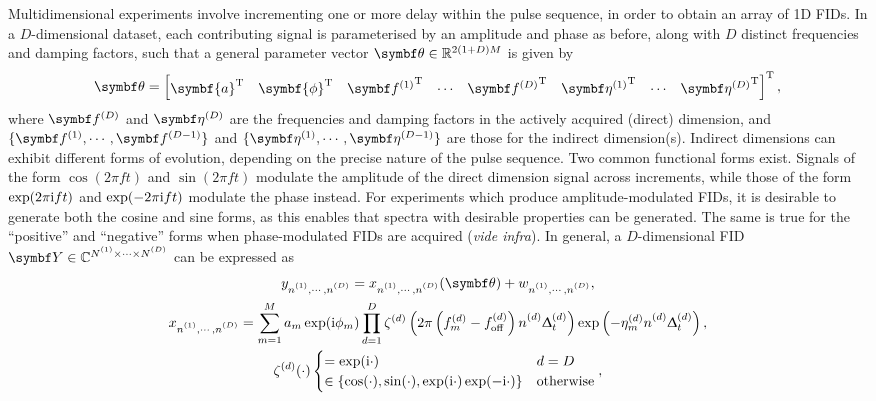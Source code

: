 Multidimensional experiments involve incrementing one or more delay within the
pulse sequence, in order to obtain an array of \ac{1D} \acp{FID}. In a
$D$-dimensional dataset, each contributing signal is parameterised by an
amplitude and phase as before, along with $D$ distinct frequencies and damping
factors, such that a general parameter vector  $\bth \in \mathbb{R}^{2(1+D)M}$
is given by
\begin{equation}
    \bth =
    \begin{bmatrix}
    \symbf{a}\T &
    \symbf{\phi}\T &
    {\bdfone}\T &
    \cdots &
    {\bdfD}\T &
    {\bdetaone}\T &
    \cdots &
    {\bdetaD}\T
    \end{bmatrix}\T,
    \label{eq:theta}
\end{equation}
where $\bdfD$ and $\bdetaD$ are the frequencies and damping factors in the
actively acquired (direct) dimension, and $\lbrace \bdfone, \cdots,
\bdfDminusone \rbrace$ and
$\lbrace \bdetaone, \cdots, \bdetaDminusone \rbrace$ are those for the indirect
dimension(s).
Indirect dimensions can exhibit different forms of evolution, depending on
the precise nature of the pulse sequence. Two common functional
forms exist\cite[Section 4.3.4]{Cavanagh2007}. Signals of the form $\cos(2 \pi
f t)$ and $\sin(2 \pi f t)$ modulate the amplitude of the direct
dimension signal across increments, while those of the form $\exp(2 \pi \mathrm{i} f
t)$ and $\exp(-2 \pi \mathrm{i} f t)$ modulate the phase instead.
For experiments which produce amplitude-modulated \acp{FID}, it is desirable to
generate both the cosine and sine forms, as this enables that spectra with
desirable properties can be generated. The same is true for the ``positive''
and ``negative'' forms when phase-modulated \acp{FID} are acquired (\emph{vide
infra}). In general, a $D$-dimensional \ac{FID} $\bY \in \mathbb{C}^{\None
\times \cdots \times \ND}$ can be expressed as
\begin{subequations}
    \begin{gather}
        \ynonenD = \xnonenD(\bth) + \wnonenD,\\
        \xnonenD
            = \sumM \amexpphim \prodD
            \zeta^{(d)}\left(2 \pi \left(f^{(d)}_m  - \foffd\right) \nd \Dtd\right)
            \exp\left(-\eta^{(d)}_m \nd \Dtd\right),\\
        \zeta^{(d)}(\cdot)
        \begin{cases}
            = \exp(\iu\cdot) & d = D \\
            \in \left\lbrace \cos(\cdot), \sin(\cdot), \exp(\iu\cdot) \exp(-\iu\cdot)\right\rbrace & \text{otherwise}
        \end{cases},
    \end{gather}
    \label{eq:general-fid}%
\end{subequations}%

